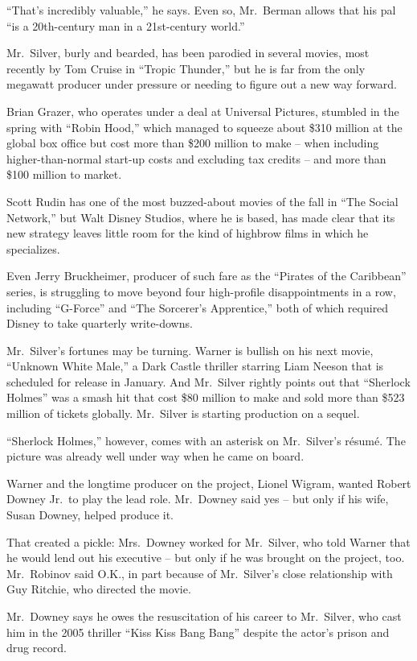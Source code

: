 ﻿\documentclass[12pt]{article}
\begin{document}
``That's incredibly valuable,'' he says. Even so, Mr.~Berman allows that his pal ``is a 20th-century
man in a 21st-century world.''

Mr.~Silver, burly and bearded, has been parodied in several movies, most recently by Tom Cruise in
``Tropic Thunder,'' but he is far from the only megawatt producer under pressure or needing to
figure out a new way forward.

Brian Grazer, who operates under a deal at Universal Pictures, stumbled in the spring with ``Robin
Hood,'' which managed to squeeze about \$310 million at the global box office but cost more than
\$200 million to make -- when including higher-than-normal start-up costs and excluding tax credits
-- and more than \$100 million to market.

Scott Rudin has one of the most buzzed-about movies of the fall in ``The Social Network,'' but Walt
Disney Studios, where he is based, has made clear that its new strategy leaves little room for the
kind of highbrow films in which he specializes.

Even Jerry Bruckheimer, producer of such fare as the ``Pirates of the Caribbean'' series, is
struggling to move beyond four high-profile disappointments in a row, including ``G-Force'' and
``The Sorcerer's Apprentice,'' both of which required Disney to take quarterly write-downs.

Mr.~Silver's fortunes may be turning. Warner is bullish on his next movie, ``Unknown White Male,'' a
Dark Castle thriller starring Liam Neeson that is scheduled for release in January. And Mr.~Silver
rightly points out that ``Sherlock Holmes'' was a smash hit that cost \$80 million to make and sold
more than \$523 million of tickets globally. Mr.~Silver is starting production on a sequel.

``Sherlock Holmes,'' however, comes with an asterisk on Mr.~Silver's r\'esum\'e. The picture was
already well under way when he came on board.

Warner and the longtime producer on the project, Lionel Wigram, wanted Robert Downey Jr.~to play the
lead role. Mr.~Downey said yes -- but only if his wife, Susan Downey, helped produce it.

That created a pickle: Mrs.~Downey worked for Mr.~Silver, who told Warner that he would lend out his
executive -- but only if he was brought on the project, too. Mr.~Robinov said O.K., in part because
of Mr.~Silver's close relationship with Guy Ritchie, who directed the movie.

Mr.~Downey says he owes the resuscitation of his career to Mr.~Silver, who cast him in the 2005
thriller ``Kiss Kiss Bang Bang'' despite the actor's prison and drug record.
\end{document}
